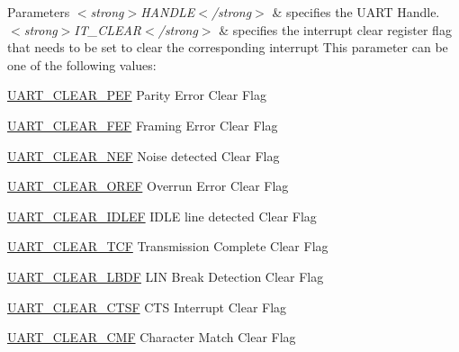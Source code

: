 \begin{DoxyParams}{Parameters}
{\em $<$strong$>$\+H\+A\+N\+D\+L\+E$<$/strong$>$} & specifies the U\+A\+RT Handle. \\
\hline
{\em $<$strong$>$\+I\+T\+\_\+\+C\+L\+E\+A\+R$<$/strong$>$} & specifies the interrupt clear register flag that needs to be set to clear the corresponding interrupt This parameter can be one of the following values\+: \begin{DoxyItemize}
\item \mbox{\hyperlink{group___u_a_r_t___i_t___c_l_e_a_r___flags_ga9c2aef8048dd09ea5e72d69c63026f02}{U\+A\+R\+T\+\_\+\+C\+L\+E\+A\+R\+\_\+\+P\+EF}} Parity Error Clear Flag \item \mbox{\hyperlink{group___u_a_r_t___i_t___c_l_e_a_r___flags_ga2040edf7a1daa2e9f352364e285ef5c3}{U\+A\+R\+T\+\_\+\+C\+L\+E\+A\+R\+\_\+\+F\+EF}} Framing Error Clear Flag \item \mbox{\hyperlink{group___u_a_r_t___i_t___c_l_e_a_r___flags_gad5b9aafb495296d917a5d85e63383396}{U\+A\+R\+T\+\_\+\+C\+L\+E\+A\+R\+\_\+\+N\+EF}} Noise detected Clear Flag \item \mbox{\hyperlink{group___u_a_r_t___i_t___c_l_e_a_r___flags_ga3bc97b70293f9a7bf8cc21a74094afad}{U\+A\+R\+T\+\_\+\+C\+L\+E\+A\+R\+\_\+\+O\+R\+EF}} Overrun Error Clear Flag \item \mbox{\hyperlink{group___u_a_r_t___i_t___c_l_e_a_r___flags_ga75ee9be0ac2236931ef3d9514e7dedf4}{U\+A\+R\+T\+\_\+\+C\+L\+E\+A\+R\+\_\+\+I\+D\+L\+EF}} I\+D\+LE line detected Clear Flag \item \mbox{\hyperlink{group___u_a_r_t___i_t___c_l_e_a_r___flags_gadfbfe4df408d1d09ff2adc1ddad3de09}{U\+A\+R\+T\+\_\+\+C\+L\+E\+A\+R\+\_\+\+T\+CF}} Transmission Complete Clear Flag \item \mbox{\hyperlink{group___u_a_r_t___i_t___c_l_e_a_r___flags_ga030414d9a93ad994156210644634b73c}{U\+A\+R\+T\+\_\+\+C\+L\+E\+A\+R\+\_\+\+L\+B\+DF}} L\+IN Break Detection Clear Flag \item \mbox{\hyperlink{group___u_a_r_t___i_t___c_l_e_a_r___flags_gabe0f3bc774ad0b9319732da3be8374cf}{U\+A\+R\+T\+\_\+\+C\+L\+E\+A\+R\+\_\+\+C\+T\+SF}} C\+TS Interrupt Clear Flag \item \mbox{\hyperlink{group___u_a_r_t___i_t___c_l_e_a_r___flags_ga5815698abf54d69b752bd2c43c2d6ad3}{U\+A\+R\+T\+\_\+\+C\+L\+E\+A\+R\+\_\+\+C\+MF}} Character Match Clear Flag \end{DoxyItemize}
\\
\hline
\end{DoxyParams}

